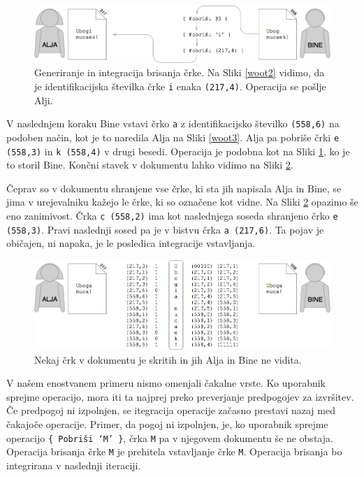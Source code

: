 \documentclass[a4paper, 12pt, twoside]{book}
\begin{document}
\begin{figure}[placement h]
\begin{center}
\includegraphics[width=13cm]{woot4.png}
\end{center}
\caption{Generiranje in integracija brisanja črke. Na Sliki \ref{woot2} vidimo, da je identifikacijska številka črke {\tt i} enaka {\tt (217,4)}. Operacija se pošlje Alji.}
\label{woot4}
\end{figure}

V naslednjem koraku Bine vstavi črko {\tt a} z identifikacijsko številko {\tt (558,6)} na podoben način, kot je to naredila Alja na Sliki \ref{woot3}. Alja pa pobriše črki {\tt e (558,3)} in {\tt k (558,4)} v drugi besedi. Operacija je podobna kot na Sliki \ref{woot4}, ko je to storil Bine. Končni stavek v dokumentu lahko vidimo na Sliki \ref{woot5}.

Čeprav so v dokumentu shranjene vse črke, ki sta jih napisala Alja in Bine, se jima v urejevalniku kažejo le črke, ki so označene kot vidne. Na Sliki \ref{woot5} opazimo še eno zanimivost. Črka {\tt c (558,2)} ima kot naslednjega soseda shranjeno črko {\tt e (558,3)}. Pravi naslednji sosed pa je v bistvu črka {\tt a (217,6)}. Ta pojav je običajen, ni napaka, je le posledica integracije vstavljanja.

\begin{figure}[placement h]
\begin{center}
\includegraphics[width=13cm]{woot5.png}
\end{center}
\caption{Nekaj črk v dokumentu je skritih in jih Alja in Bine ne vidita.}
\label{woot5}
\end{figure}

V našem enostvanem primeru nismo omenjali čakalne vrste. Ko uporabnik sprejme operacijo, mora iti ta najprej preko preverjanje predpogojev za izvršitev. Če predpogoj ni izpolnjen, se itegracija operacije začasno prestavi nazaj med čakajoče operacije. Primer, da pogoj ni izpolnjen, je, ko uporabnik sprejme operacijo {\tt \{ Pobriši ‘M’ \}}, črka {\tt M} pa v njegovem dokumentu še ne obstaja. Operacija brisanja črke {\tt M} je prehitela vstavljanje črke {\tt M}. Operacija brisanja bo integrirana v naslednji iteraciji.
\end{document}

